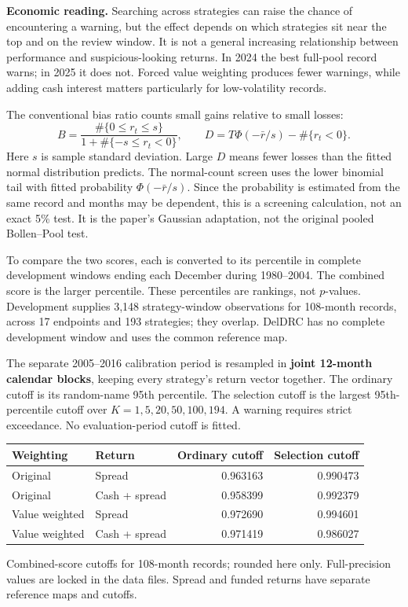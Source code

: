 \documentclass[11pt,letterpaper]{article}
\newcommand{\subhead}[1]{\vspace{5pt}{\large\bfseries #1}\par}
\newcommand{\note}[1]{{\small #1\par}}
\begin{document}
\textbf{Economic reading.} Searching across strategies can raise the chance of encountering a warning, but the effect depends on which strategies sit near the top and on the review window. It is not a general increasing relationship between performance and suspicious-looking returns. In 2024 the best full-pool record warns; in 2025 it does not. Forced value weighting produces fewer warnings, while adding cash interest matters particularly for low-volatility records.

\newpage
\subhead{2. A historical reference cutoff, and its limits}
The conventional bias ratio counts small gains relative to small losses:
\[
 B=\frac{\#\{0\le r_t\le s\}}{1+\#\{-s\le r_t<0\}},
\qquad
 D=T\Phi(-\bar r/s)-\#\{r_t<0\}.
\]
Here $s$ is sample standard deviation. Large $D$ means fewer losses than the fitted normal distribution predicts. The normal-count screen uses the lower binomial tail with fitted probability $\Phi(-\bar r/s)$. Since the probability is estimated from the same record and months may be dependent, this is a screening calculation, not an exact 5\% test. It is the paper's Gaussian adaptation, not the original pooled Bollen--Pool test.

To compare the two scores, each is converted to its percentile in complete development windows ending each December during 1980--2004. The combined score is the larger percentile. These percentiles are rankings, not $p$-values. Development supplies 3,148 strategy-window observations for 108-month records, across 17 endpoints and 193 strategies; they overlap. DelDRC has no complete development window and uses the common reference map.

The separate 2005--2016 calibration period is resampled in \textbf{joint 12-month calendar blocks}, keeping every strategy's return vector together. The ordinary cutoff is its random-name 95th percentile. The selection cutoff is the largest 95th-percentile cutoff over $K=1,5,20,50,100,194$. A warning requires strict exceedance. No evaluation-period cutoff is fitted.

\begin{center}
\begin{tabular}{llrr}
\toprule
Weighting & Return & Ordinary cutoff & Selection cutoff \\
\midrule
Original & Spread & 0.963163 & 0.990473 \\
Original & Cash + spread & 0.958399 & 0.992379 \\
Value weighted & Spread & 0.972690 & 0.994601 \\
Value weighted & Cash + spread & 0.971419 & 0.986027 \\
\bottomrule
\end{tabular}
\end{center}
\note{Combined-score cutoffs for 108-month records; rounded here only. Full-precision values are locked in the data files. Spread and funded returns have separate reference maps and cutoffs.}
\end{document}
